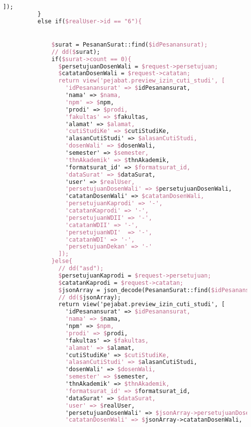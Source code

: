\begin{lstlisting}[language=tex,basicstyle=\tiny,caption=PesanansuratController.php]
              ]);
          }
          else if($realUser->id == "6"){


              $surat = PesananSurat::find($idPesanansurat);
              // dd($surat);
              if($surat->count == 0){
                $persetujuanDosenWali = $request->persetujuan;
                $catatanDosenWali = $request->catatan;
                return view('pejabat.preview_izin_cuti_studi', [
                  'idPesanansurat' => $idPesanansurat,
                  'nama' => $nama,
                  'npm' => $npm,
                  'prodi' => $prodi,
                  'fakultas' => $fakultas,
                  'alamat' => $alamat,
                  'cutiStudiKe' => $cutiStudiKe,
                  'alasanCutiStudi' => $alasanCutiStudi,
                  'dosenWali' => $dosenWali,
                  'semester' => $semester,
                  'thnAkademik' => $thnAkademik,
                  'formatsurat_id' => $formatsurat_id,
                  'dataSurat' => $dataSurat,
                  'user' => $realUser,
                  'persetujuanDosenWali' => $persetujuanDosenWali,
                  'catatanDosenWali' => $catatanDosenWali,
                  'persetujuanKaprodi' => '-',
                  'catatanKaprodi' => '-',
                  'persetujuanWDII' => '-',
                  'catatanWDII' => '-',
                  'persetujuanWDI'  => '-',
                  'catatanWDI' => '-',
                  'persetujuanDekan' => '-'
                ]);
              }else{
                // dd("asd");
                $persetujuanKaprodi = $request->persetujuan;
                $catatanKaprodi = $request->catatan;
                $jsonArray = json_decode(PesananSurat::find($idPesanansurat)->dataSurat);
                // dd($jsonArray);
                return view('pejabat.preview_izin_cuti_studi', [
                  'idPesanansurat' => $idPesanansurat,
                  'nama' => $nama,
                  'npm' => $npm,
                  'prodi' => $prodi,
                  'fakultas' => $fakultas,
                  'alamat' => $alamat,
                  'cutiStudiKe' => $cutiStudiKe,
                  'alasanCutiStudi' => $alasanCutiStudi,
                  'dosenWali' => $dosenWali,
                  'semester' => $semester,
                  'thnAkademik' => $thnAkademik,
                  'formatsurat_id' => $formatsurat_id,
                  'dataSurat' => $dataSurat,
                  'user' => $realUser,
                  'persetujuanDosenWali' => $jsonArray->persetujuanDosenWali,
                  'catatanDosenWali' => $jsonArray->catatanDosenWali,

\end{lstlisting}
